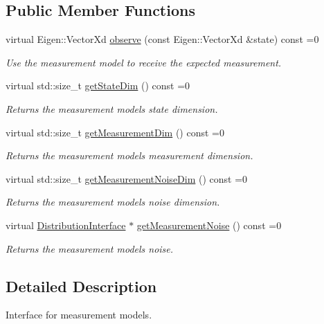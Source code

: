 \subsection*{Public Member Functions}
\begin{DoxyCompactItemize}
\item 
virtual Eigen\+::\+Vector\+Xd \hyperlink{classrefill_1_1MeasurementModelBase_a3a5613bc1ba3317e35436fc78b0d2972}{observe} (const Eigen\+::\+Vector\+Xd \&state) const =0
\begin{DoxyCompactList}\small\item\em Use the measurement model to receive the expected measurement. \end{DoxyCompactList}\item 
virtual std\+::size\+\_\+t \hyperlink{classrefill_1_1MeasurementModelBase_a5c9eed47a0c98ea9acb8f3b14447dd93}{get\+State\+Dim} () const =0
\begin{DoxyCompactList}\small\item\em Returns the measurement models state dimension. \end{DoxyCompactList}\item 
virtual std\+::size\+\_\+t \hyperlink{classrefill_1_1MeasurementModelBase_a558b2fbbc046d8476808eb5bf0bf232f}{get\+Measurement\+Dim} () const =0
\begin{DoxyCompactList}\small\item\em Returns the measurement models measurement dimension. \end{DoxyCompactList}\item 
virtual std\+::size\+\_\+t \hyperlink{classrefill_1_1MeasurementModelBase_aa6c653f6739f282135aae730126adfb5}{get\+Measurement\+Noise\+Dim} () const =0
\begin{DoxyCompactList}\small\item\em Returns the measurement models noise dimension. \end{DoxyCompactList}\item 
virtual \hyperlink{classrefill_1_1DistributionInterface}{Distribution\+Interface} $\ast$ \hyperlink{classrefill_1_1MeasurementModelBase_a32d1e80e656afeadf299442ef6280b2b}{get\+Measurement\+Noise} () const =0
\begin{DoxyCompactList}\small\item\em Returns the measurement models noise. \end{DoxyCompactList}\end{DoxyCompactItemize}


\subsection{Detailed Description}
Interface for measurement models. 

